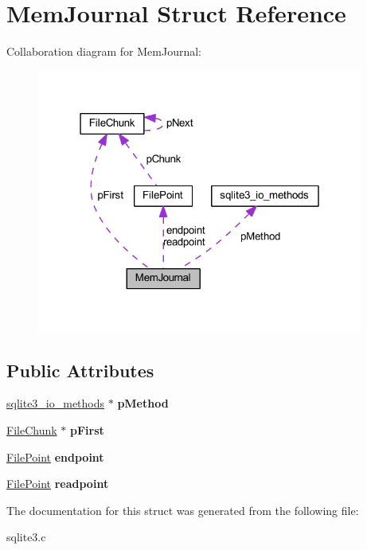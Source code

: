 \hypertarget{struct_mem_journal}{\section{Mem\-Journal Struct Reference}
\label{struct_mem_journal}
}


Collaboration diagram for Mem\-Journal\-:\nopagebreak
\begin{figure}[H]
\begin{center}
\leavevmode
\includegraphics[width=304pt]{struct_mem_journal__coll__graph}
\end{center}
\end{figure}
\subsection*{Public Attributes}
\begin{DoxyCompactItemize}
\item 
\hypertarget{struct_mem_journal_a00c1523cce1bcfadc2b672b8703a78cb}{\hyperlink{structsqlite3__io__methods}{sqlite3\-\_\-io\-\_\-methods} $\ast$ {\bfseries p\-Method}}\label{struct_mem_journal_a00c1523cce1bcfadc2b672b8703a78cb}

\item 
\hypertarget{struct_mem_journal_ade7a6dea7b38a8a86f33476ae207765f}{\hyperlink{struct_file_chunk}{File\-Chunk} $\ast$ {\bfseries p\-First}}\label{struct_mem_journal_ade7a6dea7b38a8a86f33476ae207765f}

\item 
\hypertarget{struct_mem_journal_ac69637f95cfbce175cbeef00f71e59a9}{\hyperlink{struct_file_point}{File\-Point} {\bfseries endpoint}}\label{struct_mem_journal_ac69637f95cfbce175cbeef00f71e59a9}

\item 
\hypertarget{struct_mem_journal_a5645d38e1a488b62b5f63112628bf472}{\hyperlink{struct_file_point}{File\-Point} {\bfseries readpoint}}\label{struct_mem_journal_a5645d38e1a488b62b5f63112628bf472}

\end{DoxyCompactItemize}


The documentation for this struct was generated from the following file\-:\begin{DoxyCompactItemize}
\item 
sqlite3.\-c\end{DoxyCompactItemize}
